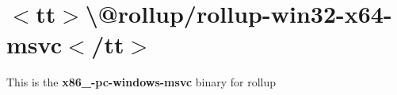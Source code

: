 \chapter{\texorpdfstring{$<$}{<}tt\texorpdfstring{$>$}{>}\textbackslash{}@rollup/rollup-\/win32-\/x64-\/msvc\texorpdfstring{$<$}{<}/tt\texorpdfstring{$>$}{>}}
\hypertarget{md__project5___h_r_2_project5___h_r___front___end_2node__modules_2_0drollup_2rollup-win32-x64-msvc_2_r_e_a_d_m_e}{}\label{md__project5___h_r_2_project5___h_r___front___end_2node__modules_2_0drollup_2rollup-win32-x64-msvc_2_r_e_a_d_m_e}
\label{md__project5___h_r_2_project5___h_r___front___end_2node__modules_2_0drollup_2rollup-win32-x64-msvc_2_r_e_a_d_m_e_autotoc_md397}%
%
 This is the {\bfseries{x86\+\_-\/pc-\/windows-\/msvc}} binary for {\ttfamily rollup} 